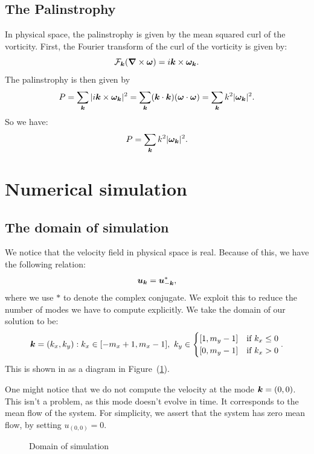 \documentclass[12pt]{article}
\def\v{\bm}
\def\vw{{\v\w}}
\begin{document}
\subsection{The Palinstrophy}
In physical space, the palinstrophy is given by the mean squared curl of the vorticity. First, the Fourier transform of the curl of the vorticity is given by:
$$\cal{F}_{\vk}(\grad\times \vw) = i\vk\times \vw_\vk.$$
The palinstrophy is then given by
$$P = \sum_{\vk} |i\vk\times \vw_\vk|^2 = \sum_{\vk} (\vk\cdot \vk ) (\vw\cdot \vw)   = \sum_{\vk} k^2|\vw_\vk|^2 .$$
So we have:
$$P = \sum_{\vk} k^2|\vw_\vk|^2 .$$
\section{Numerical simulation}
\subsection{The domain of simulation}
We notice that the velocity field in physical space is real. Because of this, we have the following relation:
\begin{equation}
\vu_\vk = \vu_{-\vk}^*,
\end{equation}
where we use $*$ to denote the complex conjugate. We exploit this to reduce the number of modes we have to compute explicitly.
We take the domain of our solution to be:
$$
\vk = (k_x, k_y): k_x \in [-m_x + 1, m_x -1],\ k_y \in
\begin{cases}
[1, m_y -1]&\text{if }k_x \leq 0\\
[0, m_y -1]&\text{if }k_x > 0\\
\end{cases}.
$$
This is shown in as a diagram in Figure~(\ref{domain}).

One might notice that we do not compute the velocity at the mode $\vk = (0,0)$. This isn't a problem, as this mode doesn't evolve in time. It corresponds to the mean flow of the system. For simplicity, we assert that the system has zero mean flow, by setting $u_{(0,0)} = 0$.
\begin{figure}[ht]
\begin{center}
\caption{Domain of simulation}\label{domain}
\end{center}
\end{figure}
\newpage
\end{document}
